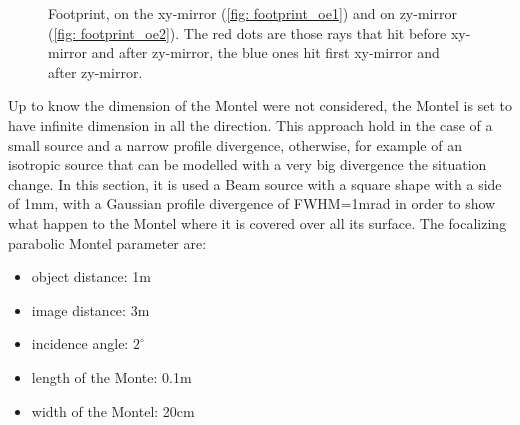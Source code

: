 \begin{figure}[]
%
\centering
%
%
\quad
%
\caption{Footprint, on the xy-mirror (\ref{fig: footprint_oe1}) and on zy-mirror (\ref{fig: footprint_oe2}). The red dots are those rays that hit before xy-mirror and after zy-mirror, the blue ones hit first xy-mirror and after zy-mirror.}
%
\label{fig: footprint}
%
\end{figure}
Up to know the dimension of the Montel were not considered, the Montel is set to have infinite dimension in all the direction. This approach hold in the case of a small source and a narrow profile divergence, otherwise, for example of an isotropic source that can be modelled with a very big divergence the situation change. In this section, it is used a Beam source with a square shape with a side of 1mm, with a Gaussian profile divergence of FWHM=1mrad in order to show what happen to the Montel  where it is covered over all its surface. The focalizing parabolic Montel parameter are:
\begin{itemize}
\item object  distance: 1m
\item image distance: 3m
\item incidence angle: $2^{\circ} $
\item length of the Monte: 0.1m
\item width of the Montel: 20cm
\end{itemize}
%
